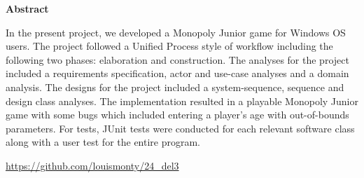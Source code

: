 \begin{flushleft} %

\begin{center}
    \vspace{0.9cm}
    \textbf{Abstract}
\end{center}
\doublespacing

In the present project, we developed a Monopoly Junior game for Windows OS users. The project followed a Unified Process style of workflow including the following two phases: elaboration and construction. The analyses for the project included a requirements specification, actor and use-case analyses and a domain analysis. The designs for the project included a system-sequence, sequence and design class analyses. The implementation resulted in a playable Monopoly Junior game with some bugs which included entering a player's age with out-of-bounds parameters. For tests, JUnit tests were conducted for each relevant software class along with a user test for the entire program. 

\addlinespace
\url{https://github.com/louismonty/24_del3}
\end{flushleft}